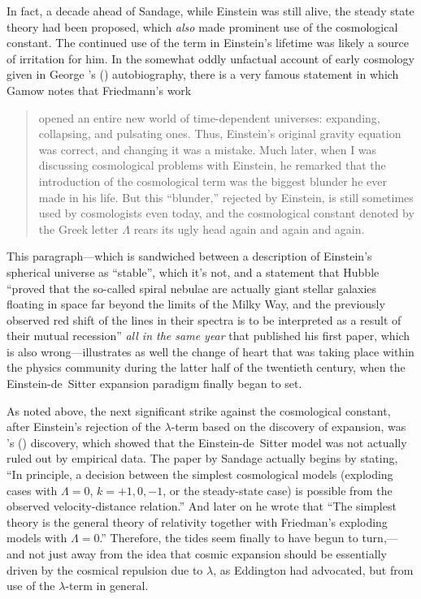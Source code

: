 \documentclass[12 pt]{article}
\def\citeapos#1{\citeauthor{#1}'s (\citeyear{#1})}
\begin{document}
In fact, a decade ahead of Sandage, while Einstein was still alive, the steady state theory had been proposed, which \textit{also} made prominent use of the cosmological constant. The continued use of the term in Einstein's lifetime was likely a source of irritation for him. In the somewhat oddly unfactual account of early cosmology given in George \citeapos{Gamow1970} autobiography, there is a very famous statement in which Gamow notes that Friedmann's work 
\begin{quote}
opened an entire new world of time-dependent universes: expanding, collapsing, and pulsating ones. Thus, Einstein's original gravity equation was correct, and changing it was a mistake. Much later, when I was discussing cosmological problems with Einstein, he remarked that the introduction of the cosmological term was the biggest blunder he ever made in his life. But this ``blunder,'' rejected by Einstein, is still sometimes used by cosmologists even today, and the cosmological constant denoted by the Greek letter $\Lambda$ rears its ugly head again and again and again.
\end{quote}
This paragraph---which is sandwiched between a description of Einstein's spherical universe as ``stable'', which it's not, and a statement that Hubble ``proved that the so-called spiral nebulae are actually giant stellar galaxies floating in space far beyond the limits of the Milky Way, and the previously observed red shift of the lines in their spectra is to be interpreted as a result of their mutual recession'' \textit{all in the same year} that \citet{Friedmann1922} published his first paper, which is also wrong---illustrates as well the change of heart that was taking place within the physics community during the latter half of the twentieth century, when the Einstein-de~Sitter expansion paradigm finally began to set.  

As noted above, the next significant strike against the cosmological constant, after Einstein's rejection of the $\lambda$-term based on the discovery of expansion, was \citeapos{Sandage1958} discovery, which showed that the Einstein-de~Sitter model was not actually ruled out by empirical data. The paper by Sandage actually begins by stating, ``In principle, a decision between the simplest cosmological models (exploding cases with $\Lambda=0$, $k=+1,0,-1$, or the steady-state case) is possible from the observed velocity-distance relation.'' And later on he wrote that ``The simplest theory is the general theory of relativity together with Friedman's exploding models with $\Lambda=0$.'' Therefore, the tides seem finally to have begun to turn,---and not just away from the idea that cosmic expansion should be essentially driven by the cosmical repulsion due to $\lambda$, as Eddington had advocated, but from use of the $\lambda$-term in general.
\end{document}
